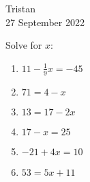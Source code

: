 \documentclass[14pt]{extarticle} %
\begin{document}
\hfill Tristan\\
\null\hfill 27 September 2022

\vspace{10mm}

Solve for $x$:
\begin{enumerate}[label=\Alph*.), itemsep=\fill]
\item $11-\frac{1}{9}x=-45$
\item $71=4-x$
\item $13=17-2x$
\vfill\clearpage
\item  $17-x=25$
\item  $-21+4x=10$
\item  $53=5x+11$
\vfill\end{enumerate}
\end{document}

